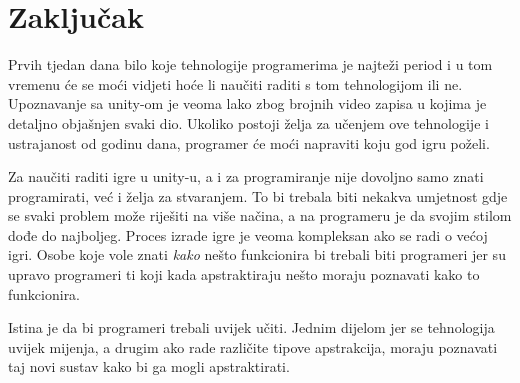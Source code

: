 \section{Zaključak}
Prvih tjedan dana bilo koje tehnologije programerima je najteži period i u tom vremenu će se moći vidjeti hoće li naučiti raditi s tom tehnologijom ili ne. Upoznavanje sa unity-om je veoma lako zbog brojnih video zapisa u kojima je detaljno objašnjen svaki dio. Ukoliko postoji želja za učenjem ove tehnologije i ustrajanost od godinu dana, programer će moći napraviti koju god igru poželi. \par
Za naučiti raditi igre u unity-u, a i za programiranje nije dovoljno samo znati programirati, već i želja za stvaranjem. To bi trebala biti nekakva umjetnost gdje se svaki problem može riješiti na više načina, a na programeru je da svojim stilom dođe do najboljeg. Proces izrade igre je veoma kompleksan ako se radi o većoj igri. Osobe koje vole znati \emph{kako} nešto funkcionira bi trebali biti programeri jer su upravo programeri ti koji kada apstraktiraju nešto moraju poznavati kako to funkcionira. \par 
Istina je da bi programeri trebali uvijek učiti. Jednim dijelom jer se tehnologija uvijek mijenja, a drugim ako rade različite tipove apstrakcija, moraju poznavati taj novi sustav kako bi ga mogli apstraktirati.